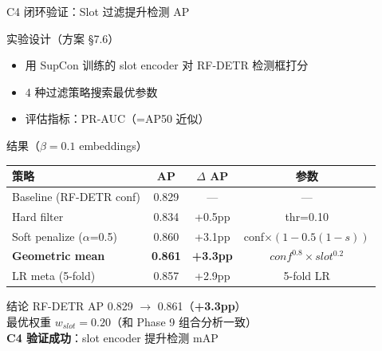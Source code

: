 \documentclass[aspectratio=169, 10pt]{beamer}
\begin{document}
\begin{frame}{C4 闭环验证：Slot 过滤提升检测 AP}
  \begin{block}{实验设计（方案 \S 7.6）}
    \begin{itemize}
      \item 用 SupCon 训练的 slot encoder 对 RF-DETR 检测框打分
      \item 4 种过滤策略搜索最优参数
      \item 评估指标：PR-AUC（=AP50 近似）
    \end{itemize}
  \end{block}
  \vspace{0em}
  \begin{alertblock}{结果（$\beta=0.1$ embeddings）}
    \begin{tabular}{lccc}
      \toprule
      \textbf{策略} & \textbf{AP} & \textbf{$\Delta$ AP} & \textbf{参数} \\
      \midrule
      Baseline (RF-DETR conf) & 0.829 & --- & --- \\
      Hard filter & 0.834 & +0.5pp & thr=0.10 \\
      Soft penalize ($\alpha$=0.5) & 0.860 & +3.1pp & conf$\times(1-0.5(1-s))$ \\
      \textbf{Geometric mean} & \textbf{0.861} & \textbf{+3.3pp} & $conf^{0.8} \times slot^{0.2}$ \\
      LR meta (5-fold) & 0.857 & +2.9pp & 5-fold LR \\
      \bottomrule
    \end{tabular}
  \end{alertblock}
  \vspace{0em}
  \begin{block}{结论}
    RF-DETR AP 0.829 $\to$ 0.861（\textbf{+3.3pp}）\\
    最优权重 $w_{slot}=0.20$（和 Phase 9 组合分析一致）\\
    \textbf{C4 验证成功}：slot encoder 提升检测 mAP
  \end{block}
\end{frame}
\end{document}
